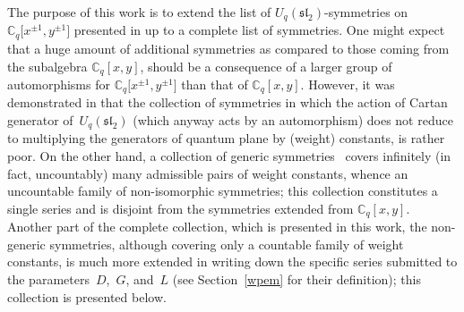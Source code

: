 \documentclass[pdftex]{sigma}
\numberwithin{equation}{section}
\begin{document}
The purpose of this work is to extend the list of $U_q(\mathfrak{sl}_2)$-symmetries on $\mathbb{C}_q\big[x^{\pm 1},y^{\pm 1}\big]$ presented in \cite{S} up to a complete list of symmetries. One might expect that a huge amount of additional symmetries as compared to those coming from the subalgebra $\mathbb{C}_q[x,y]$, should be a consequence of a larger group of automorphisms for $\mathbb{C}_q\big[x^{\pm 1},y^{\pm 1}\big]$ than that of $\mathbb{C}_q[x,y]$. However, it was demonstrated in \cite{S} that the collection of symmetries in which the action of Cartan generator of~$U_q(\mathfrak{sl}_2)$ (which anyway acts by an automorphism) does not reduce to multiplying the generators of quantum plane by (weight) constants, is rather poor. On the other hand, a collection of generic symmetries~\cite{S} covers infinitely (in fact, uncountably) many admissible pairs of weight constants, whence an uncountable family of non-isomorphic symmetries; this collection constitutes a single series and is disjoint from the symmetries extended from $\mathbb{C}_q[x,y]$. Another part of the complete collection, which is presented in this work, the non-generic symmetries, although covering only a countable family of weight constants, is much more extended in writing down the specific series submitted to the parameters~$D$,~$G$, and~$L$ (see Section~\ref{wpem} for their definition); this collection is presented below.
\end{document}
